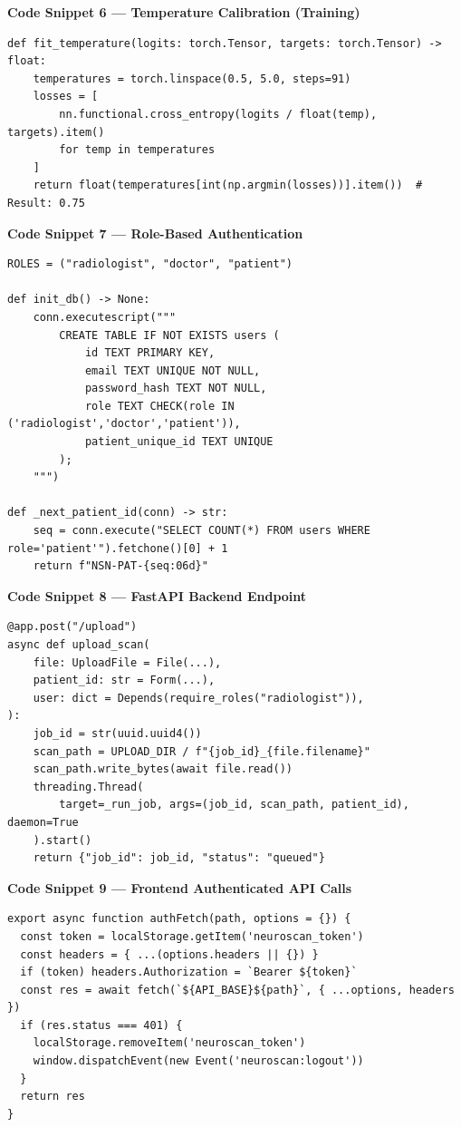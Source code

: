 \documentclass[11pt,a4paper]{article}
\begin{document}
\textbf{Code Snippet 6 --- Temperature Calibration (Training)}

\begin{lstlisting}[style=python,caption={Temperature selection (\texttt{src/cnn\_baseline.py})}]
def fit_temperature(logits: torch.Tensor, targets: torch.Tensor) -> float:
    temperatures = torch.linspace(0.5, 5.0, steps=91)
    losses = [
        nn.functional.cross_entropy(logits / float(temp), targets).item()
        for temp in temperatures
    ]
    return float(temperatures[int(np.argmin(losses))].item())  # Result: 0.75
\end{lstlisting}

\textbf{Code Snippet 7 --- Role-Based Authentication}

\begin{lstlisting}[style=python,caption={JWT auth and SQLite schema (\texttt{src/auth.py})}]
ROLES = ("radiologist", "doctor", "patient")

def init_db() -> None:
    conn.executescript("""
        CREATE TABLE IF NOT EXISTS users (
            id TEXT PRIMARY KEY,
            email TEXT UNIQUE NOT NULL,
            password_hash TEXT NOT NULL,
            role TEXT CHECK(role IN ('radiologist','doctor','patient')),
            patient_unique_id TEXT UNIQUE
        );
    """)

def _next_patient_id(conn) -> str:
    seq = conn.execute("SELECT COUNT(*) FROM users WHERE role='patient'").fetchone()[0] + 1
    return f"NSN-PAT-{seq:06d}"
\end{lstlisting}

\textbf{Code Snippet 8 --- FastAPI Backend Endpoint}

\begin{lstlisting}[style=python,caption={Protected upload endpoint (\texttt{backend.py})}]
@app.post("/upload")
async def upload_scan(
    file: UploadFile = File(...),
    patient_id: str = Form(...),
    user: dict = Depends(require_roles("radiologist")),
):
    job_id = str(uuid.uuid4())
    scan_path = UPLOAD_DIR / f"{job_id}_{file.filename}"
    scan_path.write_bytes(await file.read())
    threading.Thread(
        target=_run_job, args=(job_id, scan_path, patient_id), daemon=True
    ).start()
    return {"job_id": job_id, "status": "queued"}
\end{lstlisting}

\textbf{Code Snippet 9 --- Frontend Authenticated API Calls}

\begin{lstlisting}[style=javascript,caption={JWT token handling (\texttt{frontend/src/utils/api.js})}]
export async function authFetch(path, options = {}) {
  const token = localStorage.getItem('neuroscan_token')
  const headers = { ...(options.headers || {}) }
  if (token) headers.Authorization = `Bearer ${token}`
  const res = await fetch(`${API_BASE}${path}`, { ...options, headers })
  if (res.status === 401) {
    localStorage.removeItem('neuroscan_token')
    window.dispatchEvent(new Event('neuroscan:logout'))
  }
  return res
}
\end{lstlisting}
\end{document}
